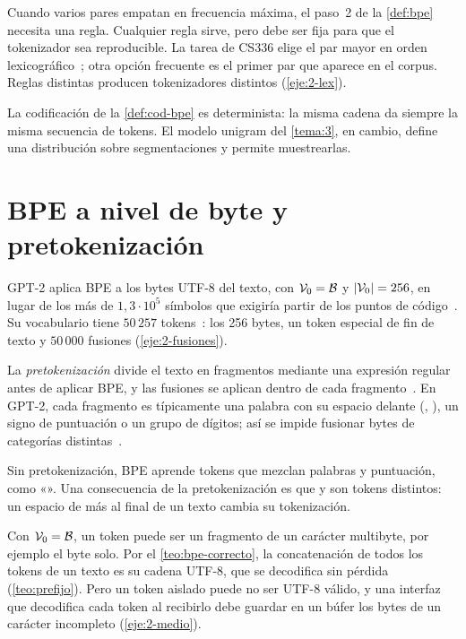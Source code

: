 Cuando varios pares empatan en frecuencia máxima, el paso~2 de la \cref{def:bpe} necesita una regla. Cualquier regla sirve, pero debe ser fija para que el tokenizador sea reproducible. La tarea de CS336 elige el par mayor en orden lexicográfico~\cite[§2.4]{cs336}; otra opción frecuente es el primer par que aparece en el corpus. Reglas distintas producen tokenizadores distintos (\cref{eje:2-lex}).

\begin{observacion}
La codificación de la \cref{def:cod-bpe} es determinista: la misma cadena da siempre la misma secuencia de tokens. El modelo unigram del \cref{tema:3}, en cambio, define una distribución sobre segmentaciones y permite muestrearlas.
\end{observacion}

\section{BPE a nivel de byte y pretokenización}

GPT-2 aplica BPE a los bytes UTF-8 del texto, con $\mathcal{V}_0=\mathcal{B}$ y $\lvert\mathcal{V}_0\rvert=256$, en lugar de los más de $1{,}3\cdot 10^{5}$ símbolos que exigiría partir de los puntos de código~\cite[§2.2]{gpt2}. Su vocabulario tiene $50\,257$ tokens~\cite[§2.3]{gpt2}: los 256 bytes, un token especial de fin de texto y $50\,000$ fusiones (\cref{eje:2-fusiones}).

\begin{definicion}[Pretokenización]
La \emph{pretokenización} divide el texto en fragmentos mediante una expresión regular antes de aplicar BPE, y las fusiones se aplican dentro de cada fragmento~\cite[§2.6.9]{jm3}. En GPT-2, cada fragmento es típicamente una palabra con su espacio delante (, ), un signo de puntuación o un grupo de dígitos; así se impide fusionar bytes de categorías distintas~\cite[§2.2]{gpt2}.
\end{definicion}

Sin pretokenización, BPE aprende tokens que mezclan palabras y puntuación, como «». Una consecuencia de la pretokenización es que  y  son tokens distintos: un espacio de más al final de un texto cambia su tokenización.

\begin{observacion}
Con $\mathcal{V}_0=\mathcal{B}$, un token puede ser un fragmento de un carácter multibyte, por ejemplo el byte  solo. Por el \cref{teo:bpe-correcto}, la concatenación de todos los tokens de un texto es su cadena UTF-8, que se decodifica sin pérdida (\cref{teo:prefijo}). Pero un token aislado puede no ser UTF-8 válido, y una interfaz que decodifica cada token al recibirlo debe guardar en un búfer los bytes de un carácter incompleto (\cref{eje:2-medio}).
\end{observacion}

